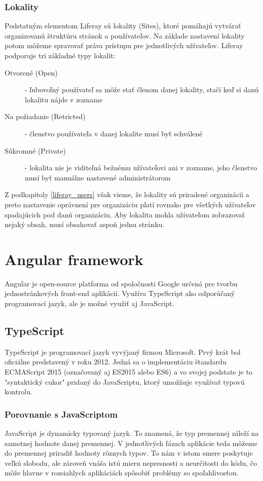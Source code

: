 \documentclass[
  digital, %
  twoside, %
  notable,   %
  nolof,   %
  nolot,   %
]{fithesis3}
\begin{document}
\subsection{Lokality}
Podstatným elementom Liferay sú lokality (Sites), ktoré pomáhajú vytvárať organizovanú štruktúru stránok a používateľov. Na základe nastavení lokality potom môžeme spravovať práva prístupu pre jednotlivých užívateľov. Liferay podporuje tri základné typy lokalít\cite{burska2016portlety}:
\begin{description}
\item[Otvorené (Open)] - ľubovoľný používateľ sa môže stať členom danej lokality, stačí keď si danú lokalitu nájde v zozname
\item[Na požiadanie (Retricted)] - členstvo používateľa v danej lokalite musí byť schválené
\item[Súkromné (Private)] - lokalita nie je viditeľná bežnému užívateľovi ani v zozname, jeho členstvo musí byť manuálne nastavené administrátorom
\end{description}
Z podkapitoly \ref{liferay_users} však vieme, že lokality sú priradené organizácii a preto nastavenie oprávnení pre organizáciu platí rovnako pre všetkých užívateľov spadajúcich pod danú organizáciu. Aby lokalita mohla užívateľom zobrazovať nejaký obsah, musí obsahovať aspoň jednu stránku.

\chapter{Angular framework}
Angular je open-source platforma od spoločnosti Google určená pre tvorbu jednostránkových front-end aplikácií. Využíva TypeScript ako odporúčaný programovací jazyk, ale je možné využiť aj JavaScript.

\section{TypeScript}
TypeScript je programovací jazyk vyvýjaný firmou Microsoft. Prvý krát bol oficiálne predstavený v roku 2012. Jedná sa o implementáciu štandardu ECMAScript 2015 (označovaný aj ES2015 alebo ES6) a vo svojej podstate je to "syntaktický cukor" pridaný do JavaScriptu, ktorý umožňuje využívať typovú kontrolu.

\subsection{Porovnanie s JavaScriptom}
JavaScript je dynamicky typovaný jazyk. To znamená, že typ premennej záleží na samotnej hodnote danej premennej. V jednotlivých fázach aplikácie teda môžeme do premennej priradiť hodnoty rôznych typov. To nám v istom smere poskytuje veľkú slobodu, ale zároveň vnáša istú mieru nepresnosti a neurčitosti do kódu, čo môže hlavne v rozsiahlych aplikáciách spôsobiť problémy so spoľahlivosťou.
\end{document}
